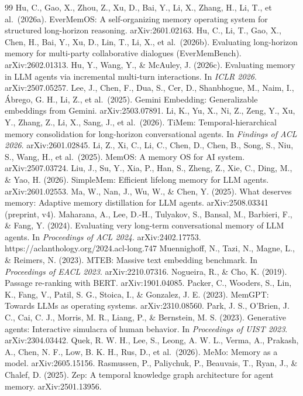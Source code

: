 \documentclass[a4paper,fleqn]{cas-sc}
\begin{document}
\begin{thebibliography}{99}
\bibitem{} Hu, C., Gao, X., Zhou, Z., Xu, D., Bai, Y., Li, X., Zhang, H., Li, T., et al.~(2026a). EverMemOS: A self-organizing memory operating system for structured long-horizon reasoning. arXiv:2601.02163.
\bibitem{} Hu, C., Li, T., Gao, X., Chen, H., Bai, Y., Xu, D., Lin, T., Li, X., et al.~(2026b). Evaluating long-horizon memory for multi-party collaborative dialogues (EverMemBench). arXiv:2602.01313.
\bibitem{} Hu, Y., Wang, Y., \& McAuley, J. (2026c). Evaluating memory in LLM agents via incremental multi-turn interactions. In \emph{ICLR 2026}. arXiv:2507.05257.
\bibitem{} Lee, J., Chen, F., Dua, S., Cer, D., Shanbhogue, M., Naim, I., Ábrego, G. H., Li, Z., et al.~(2025). Gemini Embedding: Generalizable embeddings from Gemini. arXiv:2503.07891.
\bibitem{} Li, K., Yu, X., Ni, Z., Zeng, Y., Xu, Y., Zhang, Z., Li, X., Sang, J., et al.~(2026). TiMem: Temporal-hierarchical memory consolidation for long-horizon conversational agents. In \emph{Findings of ACL 2026}. arXiv:2601.02845.
\bibitem{} Li, Z., Xi, C., Li, C., Chen, D., Chen, B., Song, S., Niu, S., Wang, H., et al.~(2025). MemOS: A memory OS for AI system. arXiv:2507.03724.
\bibitem{} Liu, J., Su, Y., Xia, P., Han, S., Zheng, Z., Xie, C., Ding, M., \& Yao, H. (2026). SimpleMem: Efficient lifelong memory for LLM agents. arXiv:2601.02553.
\bibitem{} Ma, W., Nan, J., Wu, W., \& Chen, Y. (2025). What deserves memory: Adaptive memory distillation for LLM agents. arXiv:2508.03341 (preprint, v4).
\bibitem{} Maharana, A., Lee, D.-H., Tulyakov, S., Bansal, M., Barbieri, F., \& Fang, Y. (2024). Evaluating very long-term conversational memory of LLM agents. In \emph{Proceedings of ACL 2024}. arXiv:2402.17753. https://aclanthology.org/2024.acl-long.747
\bibitem{} Muennighoff, N., Tazi, N., Magne, L., \& Reimers, N. (2023). MTEB: Massive text embedding benchmark. In \emph{Proceedings of EACL 2023}. arXiv:2210.07316.
\bibitem{} Nogueira, R., \& Cho, K. (2019). Passage re-ranking with BERT. arXiv:1901.04085.
\bibitem{} Packer, C., Wooders, S., Lin, K., Fang, V., Patil, S. G., Stoica, I., \& Gonzalez, J. E. (2023). MemGPT: Towards LLMs as operating systems. arXiv:2310.08560.
\bibitem{} Park, J. S., O'Brien, J. C., Cai, C. J., Morris, M. R., Liang, P., \& Bernstein, M. S. (2023). Generative agents: Interactive simulacra of human behavior. In \emph{Proceedings of UIST 2023}. arXiv:2304.03442.
\bibitem{} Quek, R. W. H., Lee, S., Leong, A. W. L., Verma, A., Prakash, A., Chen, N. F., Low, B. K. H., Rus, D., et al.~(2026). MeMo: Memory as a model. arXiv:2605.15156.
\bibitem{} Rasmussen, P., Paliychuk, P., Beauvais, T., Ryan, J., \& Chalef, D. (2025). Zep: A temporal knowledge graph architecture for agent memory. arXiv:2501.13956.

\end{thebibliography}
\end{document}
